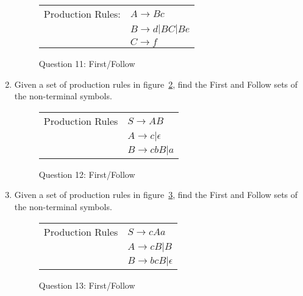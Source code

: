 \documentclass[10pt, oneside, letterpaper]{article}
\begin{document}
\begin{enumerate}
\begin{figure}[!htb]
	\caption{Question 11: First/Follow}
	\label{tab:q11-first-follow}
	\begin{center}
		\begin{tabular}{ r | l }
			Production Rules:
			& $A \rightarrow Bc$ \\
			& $B \rightarrow d | BC | Be $ \\
			& $C \rightarrow f$ \\
		\end{tabular}
	\end{center}
\end{figure}

		\clearpage
	
		\item Given a set of production rules in figure~\ref{tab:q12-first-follow}, find the First and Follow sets of the non-terminal symbols.
		
\begin{figure}[!htb]
	\caption{Question 12: First/Follow}
	\label{tab:q12-first-follow}
	\begin{center}
		\begin{tabular}{ r | l }
			Production Rules
			& $S \rightarrow AB$ \\
			& $A \rightarrow c | \epsilon$ \\
			& $B \rightarrow cbB | a$ \\
		\end{tabular}
	\end{center}
\end{figure}

		\clearpage
	
		\item Given a set of production rules in figure~\ref{tab:q13-first-follow}, find the First and Follow sets of the non-terminal symbols.

\begin{figure}[!htb]
	\caption{Question 13: First/Follow}
	\label{tab:q13-first-follow}
	\begin{center}
		\begin{tabular}{ r | l }
			Production Rules
			& $S \rightarrow cAa$ \\
			& $A \rightarrow cB | B$ \\
			& $B \rightarrow bcB | \epsilon$ \\
		\end{tabular}
	\end{center}
\end{figure}


\end{enumerate}
\end{document}
